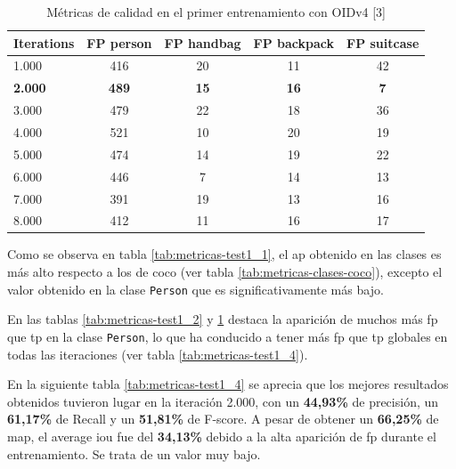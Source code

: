 \begin{table}[ht]
\centering
\caption{Métricas de calidad en el primer entrenamiento con OIDv4 [3]}
\label{tab:metricas-test1_3}
\begin{tabular}{lcccc}
\hline
\textbf{Iterations} & \textbf{FP person} & \textbf{FP handbag} & \textbf{FP backpack} & \textbf{FP suitcase} \\ \hline
1.000               & 416                & 20                  & 11                   & 42                   \\
\textbf{2.000}      & \textbf{489}       & \textbf{15}         & \textbf{16}          & \textbf{7}           \\
3.000               & 479                & 22                  & 18                   & 36                   \\
4.000               & 521                & 10                  & 20                   & 19                   \\
5.000               & 474                & 14                  & 19                   & 22                   \\
6.000               & 446                & 7                   & 14                   & 13                   \\
7.000               & 391                & 19                  & 13                   & 16                   \\
8.000               & 412                & 11                  & 16                   & 17                   \\ \hline
\end{tabular}
\end{table}

Como se observa en tabla \ref{tab:metricas-test1_1}, el \gls{ap} obtenido en las clases es más alto respecto a los de \gls{coco} (ver tabla \ref{tab:metricas-clases-coco}), excepto el valor obtenido en la clase \texttt{Person} que es significativamente más bajo.

En las tablas \ref{tab:metricas-test1_2} y \ref{tab:metricas-test1_3} destaca la aparición de muchos más \gls{fp} que \gls{tp} en la clase \texttt{Person}, lo que ha conducido a tener más \gls{fp} que \gls{tp} globales en todas las iteraciones (ver tabla \ref{tab:metricas-test1_4}).

En la siguiente tabla \ref{tab:metricas-test1_4} se aprecia que los mejores resultados obtenidos tuvieron lugar en la iteración 2.000, con un \textbf{44,93\%} de precisión, un \textbf{61,17\%} de Recall y un \textbf{51,81\%} de F-score. A pesar de obtener un \textbf{66,25\%} de \gls{map}, el average \gls{iou} fue del \textbf{34,13\%} debido a la alta aparición de \gls{fp} durante el entrenamiento. Se trata de un valor muy bajo.

